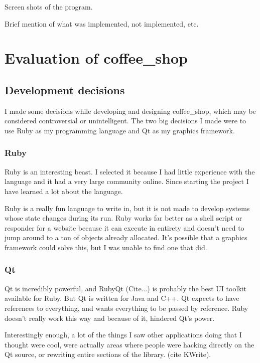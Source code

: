 \documentclass[11pt]{article}
\begin{document}
Screen shots of the program.

Brief mention of what was implemented, not implemented, etc.

\section{Evaluation of coffee\_shop}

\subsection{Development decisions}

I made some decisions while developing and designing coffee\_shop, which may be considered controversial or unintelligent. The two big decisions I made were to use Ruby as my programming language and Qt as my graphics framework.

\subsubsection{Ruby}

Ruby is an interesting beast. I selected it because I had little experience with the language and it had a very large community online. Since starting the project I have learned a lot about the language.

Ruby is a really fun language to write in, but it is not made to develop systems whose state changes during its run. Ruby works far better as a shell script or responder for a website because it can execute in entirety and doesn't need to jump around to a ton of objects already allocated. It's possible that a graphics framework could solve this, but I was unable to find one that did.

\subsubsection{Qt}

Qt is incredibly powerful, and RubyQt (Cite...) is probably the best UI toolkit available for Ruby. But Qt is written for Java and C++. Qt expects to have references to everything, and wants everything to be passed by reference. Ruby doesn't really work this way and because of it, hindered Qt's power.

Interestingly enough, a lot of the things I saw other applications doing that I thought were cool, were actually areas where people were hacking directly on the Qt source, or rewriting entire sections of the library. (cite KWrite).
\end{document}
